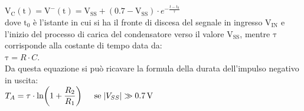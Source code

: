 \documentclass{report}
\begin{document}
\\[2pt]\indent$\displaystyle{\mathrm{V_C(t)}=\mathrm{V^-(t)}=\mathrm{V_{SS}}+(0.7-\mathrm{V_{SS}}) \cdot e^{-\frac{t-t_0}{\tau}}}$
\\dove $\mathrm{t_0}$ è l'istante in cui si ha il fronte di discesa del segnale in ingresso $\mathrm{V_{IN}}$ e l'inizio del processo di carica del condensatore verso il valore $\mathrm{V_{SS}}$, mentre $\mathrm{\tau}$ corrisponde alla costante di tempo data da: \\\indent$\displaystyle{\mathrm{\tau}= R \cdot C}$.
\\Da questa equazione si può ricavare la formula della durata dell'impulso negativo in uscita:
\\[2pt]\indent$\displaystyle{T_A=\tau\cdot\ln\biggl(1+\frac{R_2}{R_1}\biggr)\indent \mathrm{se\;}|V_{SS}|\gg\SI{0.7}{\volt}}$
\end{document}
